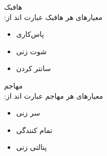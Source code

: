 \documentclass[]{article}
\begin{document}
ﻫﺎﻓﺒﮏ
\\
‫ﻣﻌﯿﺎرﻫﺎی ﻫﺮ ﻫﺎﻓﺒﮏ ﻋﺒﺎرت اﻧﺪ از‪:‬‬
\begin{itemize}
	\item
	‫ ﭘﺎسﮐﺎری ‬‬‫ 
	\item
	ﺷﻮت زﻧﯽ ‬‬‫ 
	\item
	ﺳﺎﻧﺘﺮ ﮐﺮدن 
\end{itemize}
ﻣﻬﺎﺟﻢ
\\
‫ﻣﻌﯿﺎرﻫﺎی ﻫﺮ ﻣﻬﺎﺟﻢ ﻋﺒﺎرت اﻧﺪ از:
\begin{itemize}
	\item
	سر زنی  
	\item
	تمام کنندگی  
	\item
	پنالتی زنی 
\end{itemize}
\end{document}
